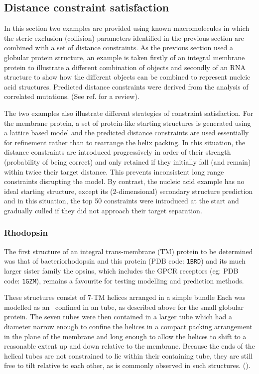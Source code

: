 \documentclass[review]{elsarticle}
\begin{document}
{{{{{\subsection{Distance constraint satisfaction}

In this section two examples are provided using known macromolecules in
which the steric exclusion (collision) parameters identified in the previous section are
combined with a set of distance constraints.
As the previous section used a globular protein structure, an example is
taken firstly of an integral membrane protein to illustrate a different 
combination of objects and secondly of an RNA structure to show how the
different objects can be combined to represent nucleic acid structures.
Predicted distance constraints were derived from the analysis of correlated
mutations.  (See ref.\cite{TaylorWRet13} for a review).

The two examples also illustrate different strategies of constraint
satisfaction.   For the membrane protein, a set of protein-like starting 
structures is generated using a lattice based model \cite{TaylorWRet94a} and the
predicted distance constraints are used essentially for refinement rather
than to rearrange the helix packing.  In this situation, the distance
constraints are introduced progressively in order of their strength
(probability of being correct) and only retained if they initially
fall (and remain) within twice their target distance.   This prevents
inconsistent long range constraints disrupting the model.  By contrast,
the nucleic acid example has no ideal starting structure, except its
(2-dimensional) secondary structure prediction and in this situation,
the top 50 constraints were introduced at the start and gradually culled
if they did not approach their target separation.  

\subsubsection{Rhodopsin}

The first structure of an integral trans-membrane (TM) protein to be determined
was that of bacteriorhodopsin and this protein (PDB code: {\tt 1BRD}) and its
much larger sister family the opsins, which includes the GPCR receptors (eg: PDB code:
{\tt 1GZM}), remains a favourite for testing modelling and prediction methods.

These structures consist of 7-TM helices arranged in a simple bundle
Each was modelled as an \AH\ confined in an tube, as described above for the
small globular protein.   The seven tubes were then contained in a larger
tube which had a diameter narrow enough to confine the helices in a compact
packing arrangement in the plane of the membrane and long enough to allow 
the helices to shift to a reasonable extent up and down relative to the membrane.  
Because the ends of the helical tubes are not constrained to lie within their
containing tube, they are still free to tilt relative to each other, as is
commonly observed in such structures.  ().

}}}}}
\end{document}

